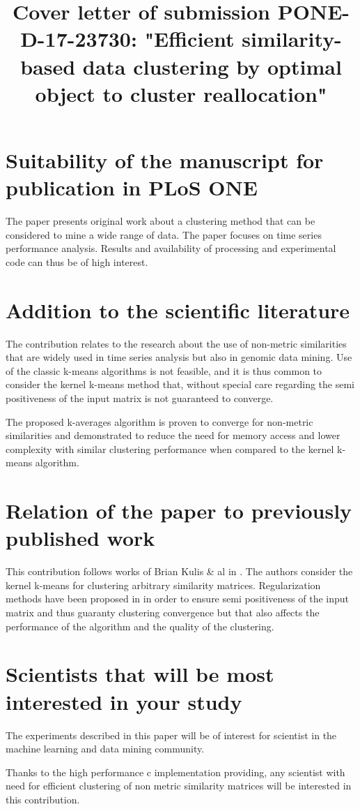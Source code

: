 \documentclass[10pt]{article}
\title{Cover letter of submission PONE-D-17-23730: "Efficient similarity-based data clustering by optimal object to cluster reallocation"}
\begin{document}
\maketitle

\section{Suitability of the manuscript for publication in PLoS ONE}

The paper presents original work about a clustering method that can be considered to mine a wide range of data. The paper focuses on time series performance analysis. Results and availability of processing and experimental code can thus be of high interest.

\section{Addition to the scientific literature}

The contribution relates to the research about the use of non-metric similarities that are widely used in time series analysis but also in genomic data mining. Use of the classic k-means algorithms is not feasible, and it is thus common to consider the kernel k-means method that, without special care regarding the semi positiveness of the input matrix is not guaranteed to converge.

The proposed k-averages algorithm is proven to converge for non-metric similarities and demonstrated to reduce the need for memory access and lower complexity with similar clustering performance when compared to the kernel k-means algorithm.

\section{Relation of the paper to previously published work}

This contribution follows works of Brian Kulis \& al in \cite{Kulis2008, Dhillon:2007:WGC:1313055.1313291}. The authors consider the kernel k-means for clustering arbitrary similarity matrices. Regularization methods have been proposed in \cite{Roth:2003:OCP:960254.960291} in order to ensure semi positiveness of the input matrix and thus guaranty clustering convergence but that also affects the performance of the algorithm and the quality of the clustering.

\section{Scientists that will be most interested in your study}

The experiments described in this paper will be of interest for scientist in the machine learning and data mining community.

Thanks to the high performance c implementation providing, any scientist with need for efficient clustering of non metric similarity matrices will be interested in this contribution.




\end{document}
